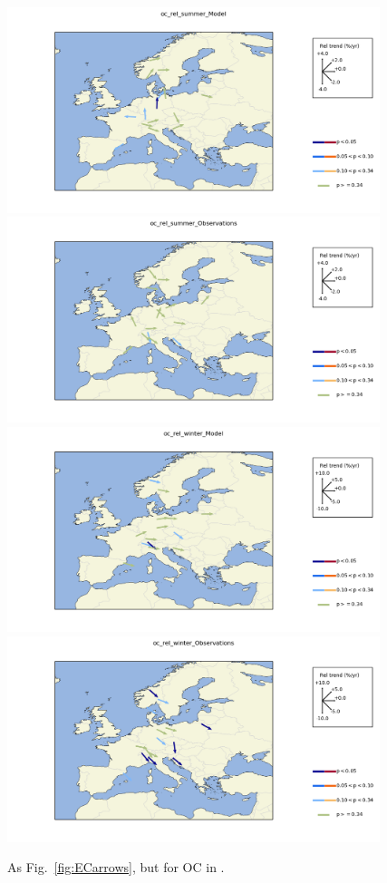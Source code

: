 
\begin{figure}
\includegraphics*[height=6cm,trim=3cm 0 0 0 0]{FIGS_TRENDS/Plot_oc_rel_summer_Model.png}%
\includegraphics*[height=6cm,trim=3cm 0 6.9cm 0]{FIGS_TRENDS/Plot_oc_rel_summer_Observations.png}
\\
\includegraphics*[height=6cm,trim=3cm 0 0 0]{FIGS_TRENDS/Plot_oc_rel_winter_Model.png}%
\includegraphics*[height=6cm,trim=3cm 0 6.9cm 0]{FIGS_TRENDS/Plot_oc_rel_winter_Observations.png}
\caption{As Fig.~\ref{fig:ECarrows}, but for OC in \pmfine.
 \label{fig:OCarrows}}
\end{figure}


